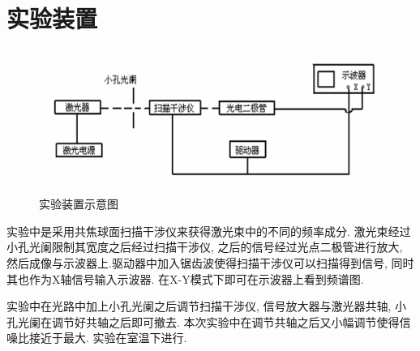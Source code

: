 \documentclass[aps,pre,12pt,preprint,%
	onecolumn,showpacs,showkeys,nofootinbib]{revtex4-2}
\begin{document}
\section{实验装置}
	\begin{figure}[!h]
	\centering
	\includegraphics[width=.8\linewidth]{img/2.png}
	\caption[实验装置示意图]{实验装置示意图}\vspace{1ex}
	\end{figure}
\par 实验中是采用共焦球面扫描干涉仪来获得激光束中的不同的频率成分. 激光束经过小孔光阑限制其宽度之后经过扫描干涉仪, 之后的信号经过光点二极管进行放大, 然后成像与示波器上.驱动器中加入锯齿波使得扫描干涉仪可以扫描得到信号, 同时其也作为X轴信号输入示波器. 在X-Y模式下即可在示波器上看到频谱图.
\par 实验中在光路中加上小孔光阑之后调节扫描干涉仪, 信号放大器与激光器共轴, 小孔光阑在调节好共轴之后即可撤去. 本次实验中在调节共轴之后又小幅调节使得信噪比接近于最大. 实验在室温下进行.
\end{document}
